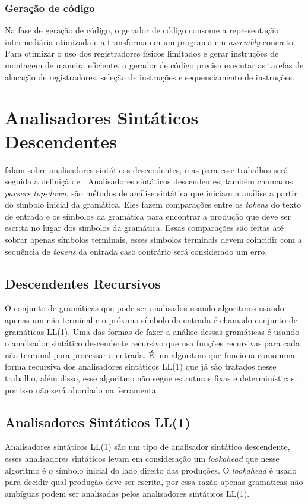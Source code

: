 \subsubsection{Geração de código}
Na fase de geração de código, o gerador de código consome a representação intermediária otimizada e a transforma em um programa em \textit{assembly} concreto. Para otimizar o uso dos registradores físicos limitados e gerar instruções de montagem de maneira eficiente, o gerador de código precisa executar as tarefas de alocação de registradores, seleção de instruções e sequenciamento de instruções.

\section{Analisadores Sintáticos Descendentes}
\textcite{cooper2022engineering,mogensen2024introduction, thain2020introduction} falam sobre analisadores sintáticos descendentes, mas para esse trabalhos será seguida a definiçã de \textcite{thain2020introduction}. Analisadores sintáticos descendentes, também chamados \textit{parsers top-down}, são métodos de análise sintática que iniciam a análise a partir do símbolo inicial da gramática. Eles fazem comparações entre os \textit{tokens} do texto de entrada e os símbolos da gramática para encontrar a produção que deve ser escrita no lugar dos símbolos da gramática. Essas comparações são feitas até sobrar apenas símbolos terminais, esses símbolos terminais devem coincidir com a sequência de \textit{tokens} da entrada caso contrário será considerado um erro.

\subsection{Descendentes Recursivos}
O conjunto de gramáticas que pode ser analisados usando algoritmos usando apenas um não terminal e o próximo símbolo da entrada é chamado conjunto de gramáticas LL(1). Uma das formas de fazer a análise dessas gramáticas é usando o analisador sintático descendente recursivo que usa funções recursivas para cada não terminal para processar a entrada. É um algoritmo que funciona como uma forma recursiva dos analisadores sintáticos LL(1) que já são tratados nesse trabalho, além disso, esse algoritmo não segue estruturas fixas e determinísticas, por isso não será abordado na ferramenta.

\subsection{Analisadores Sintáticos LL(1)} 
Analisadores sintáticos LL(1) são um tipo de analisador sintático descendente, esses analisadores sintáticos levam em consideração um \textit{lookahead} que nesse algoritmo é o símbolo inicial do lado direito das produções. O \textit{lookahead} é usado para decidir qual produção deve ser escrita, por essa razão apenas gramaticas não ambíguas podem ser analisadas pelos analisadores sintáticos LL(1).


